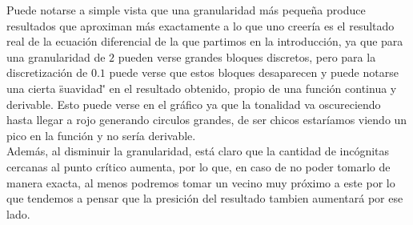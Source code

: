 Puede notarse a simple vista que una granularidad más pequeña produce resultados que aproximan más exactamente a lo que uno creería es el resultado real de la ecuación diferencial de la que partimos en la introducción, ya que para una granularidad de $2$ pueden verse grandes bloques discretos, pero para la discretización de $0.1$ puede verse que estos bloques desaparecen y puede notarse una cierta \"suavidad\"' en el resultado obtenido, propio de una función continua y derivable. Esto puede verse en el gráfico ya que la tonalidad va oscureciendo hasta llegar a rojo generando circulos grandes, de ser chicos estaríamos viendo un pico en la función y no sería derivable.
\\
Además, al disminuir la granularidad, está claro que la cantidad de incógnitas cercanas al punto crítico aumenta, por lo que, en caso de no poder tomarlo de manera exacta, al menos podremos tomar un vecino muy próximo a este por lo que tendemos a pensar que la presición del resultado tambien aumentará por ese lado.
